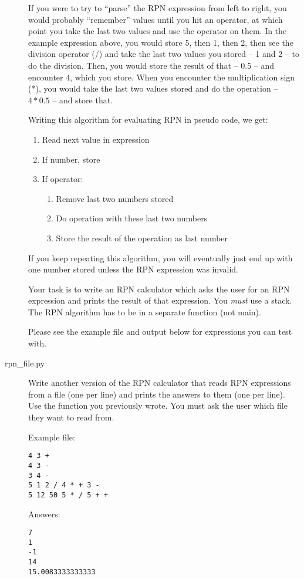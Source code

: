 \documentclass[11pt]{cselabheader}
\begin{document}
\begin{description}
    If you were to try to ``parse'' the RPN expression from left to right, you
    would probably ``remember'' values until you hit an operator, at which point
    you take the last two values and use the operator on them. In the example
    expression above, you would store 5, then 1, then 2, then see the division
    operator (/) and take the last two values you stored -- 1 and 2 -- to do the
    division. Then, you would store the result of that -- 0.5 -- and encounter
    4, which you store. When you encounter the multiplication sign (*), you
    would take the last two values stored and do the operation -- $4 * 0.5$ --
    and store that. 

    Writing this algorithm for evaluating RPN in pseudo code, we get:

\begin{enumerate}
  \item Read next value in expression
  \item If number, store
  \item If operator:
    \begin{enumerate}
      \item Remove last two numbers stored
      \item Do operation with these last two numbers
      \item Store the result of the operation as last number
    \end{enumerate}
\end{enumerate}

    If you keep repeating this algorithm, you will eventually just end up with
    one number stored unless the RPN expression was invalid.

    Your task is to write an RPN calculator which asks the user for an RPN
    expression and prints the result of that expression. You \emph{must} use a
    stack. The RPN algorithm has to be in a separate function (not main).

    Please see the example file and output below for expressions you can test
    with.

  \item[rpn\_file.py] Write another version of the RPN calculator that reads
    RPN expressions from a file (one per line) and prints the answers to them
    (one per line). Use the function you previously wrote. You must ask the user
    which file they want to read from.

    Example file:
    \begin{lstlisting}
4 3 +
4 3 -
3 4 -
5 1 2 / 4 * + 3 -
5 12 50 5 * / 5 + +
    \end{lstlisting}

    Answers:
    \begin{lstlisting}
7
1
-1
14
15.0083333333333
    \end{lstlisting}
    
\end{description}
\end{document}
